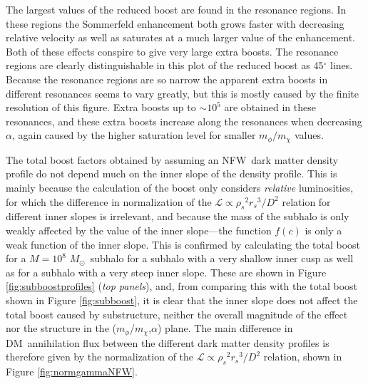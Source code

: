 \documentclass[aps,prd,twocolumn,amsmath,amssymb,floatfix,nofootinbib,10pt]{revtex4}
\newcommand{\NFW}{NFW}
\newcommand{\DM}{DM}
\newcommand{\mdm}{\ensuremath{m_{\chi}}}
\newcommand{\mv}{\ensuremath{m_{\phi}}}
\newcommand{\lum}{\ensuremath{\mathcal{L}}}
\newcommand{\rhos}{\ensuremath{\rho_s}}
\newcommand{\rs}{\ensuremath{r_s}}
\newcommand{\dist}{\ensuremath{D}}
\newcommand{\Msol}{\ensuremath{M_{\odot}}}
\newcommand{\Msun}{\Msol}
\newcommand{\degree}{^\circ}
\begin{document}
The largest values of the reduced boost are found in the resonance
regions. In these regions the Sommerfeld enhancement both grows faster
with decreasing relative velocity as well as saturates at a much
larger value of the enhancement. Both of these effects conspire to
give very large extra boosts. The resonance regions are clearly
distinguishable in this plot of the reduced boost as 45$\degree$
lines. Because the resonance regions are so narrow the apparent extra
boosts in different resonances seems to vary greatly, but this is
mostly caused by the finite resolution of this figure. Extra boosts up
to $\sim 10^5$ are obtained in these resonances, and these extra
boosts increase along the resonances when decreasing $\alpha$, again
caused by the higher saturation level for smaller $\mv/\mdm$ values.



The total boost factors obtained by assuming an \NFW\ dark matter
density profile do not depend much on the inner slope of the density
profile. This is mainly because the calculation of the boost only
considers \emph{relative} luminosities, for which the difference in
normalization of the $\lum \propto \rhos^2 \rs^3/\dist^2$ relation for
different inner slopes is irrelevant, and because the mass of the
subhalo is only weakly affected by the value of the inner slope---the
function $f(c)$ is only a weak function of the inner slope. This is
confirmed by calculating the total boost for a $M = 10^8$ \Msun\
subhalo for a subhalo with a very shallow inner cusp as well as for a
subhalo with a very steep inner slope. These are shown in Figure
\ref{fig:subboostprofiles} (\emph{top panels}), and, from comparing
this with the total boost shown in Figure \ref{fig:subboost}, it is
clear that the inner slope does not affect the total boost caused by
substructure, neither the overall magnitude of the effect nor the
structure in the (\mv/\mdm,$\alpha$) plane. The main difference in
\DM\ annihilation flux between the different dark matter density
profiles is therefore given by the normalization of the $\lum \propto
\rhos^2 \rs^3/\dist^2$ relation, shown in Figure
\ref{fig:normgammaNFW}.
\end{document}
